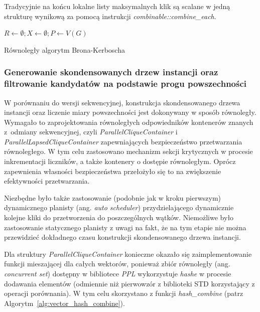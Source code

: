 \documentclass[12pt]{article}
\begin{document}
Tradycyjnie na końcu lokalne listy maksymalnych klik są scalane w jedną strukturę wynikową za pomocą instrukcji \textit{combinable::combine\_each}.
\begin{algorithm}

$R \leftarrow \emptyset; X \leftarrow \emptyset; P \leftarrow V(G)$\;
\caption{Równoległy algorytm Brona-Kerboscha}
\label{alg:bk3}
\end{algorithm}

\subsubsection{Generowanie skondensowanych drzew instancji oraz filtrowanie kandydatów na podstawie progu powszechności}

W porównaniu do wersji sekwencyjnej, konstrukcja skondensowanego drzewa instancji oraz liczenie miary powszechności jest dokonywany w sposób równoległy. Wymagało to zaprojektowania równoległych odpowiedników kontenerów znanych z~odmiany sekwencyjnej, czyli \textit{ParallelCliqueContainer} i \textit{ParallelLapsedCliqueContainer} zapewniających bezpieczeństwo przetwarzania równoległego. W tym celu zastosowano mechanizm sekcji krytycznych w procesie inkrementacji liczników, a także kontenery o dostępie równoległym. Oprócz zapewnienia własności bezpieczeństwa przełożyło się to na zwiększenie efektywności przetwarzania.

Niezbędne było także zastosowanie (podobnie jak w kroku pierwszym) dynamicznego planisty (ang. \textit{auto scheduler}) przydzielającego dynamicznie kolejne kliki do przetworzenia do poszczególnych wątków. Niemożliwe było zastosowanie statycznego planisty z uwagi na fakt, że na tym etapie nie można przewidzieć dokładnego czasu konstrukcji skondensowanego drzewa instancji.

Dla struktury \textit{ParallelCliqueContainer} konieczne okazało się zaimplementowanie funkcji mieszającej dla całych wektorów, ponieważ zbiór równoległy (ang. \textit{concurrent set}) dostępny w bibliotece \textit{PPL} wykorzystuje \textit{hashe} w procesie dodawania elementów (odmiennie niż pierwowzór z biblioteki STD korzystający z operacji porównania). W tym celu skorzystano z funkcji \textit{hash\_combine} (patrz Algorytm~\ref{alg:vector_hash_combine}).
\end{document}
